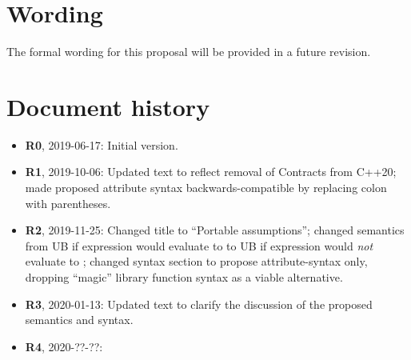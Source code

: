\section{Wording}

The formal wording for this proposal will be provided in a future revision.

\section*{Document history}

\begin{itemize}
\item \textbf{R0}, 2019-06-17: Initial version.
\item \textbf{R1}, 2019-10-06: Updated text to reflect removal of Contracts from C++20; made proposed attribute syntax backwards-compatible by replacing colon with parentheses.
\item \textbf{R2}, 2019-11-25: Changed title to ``Portable assumptions''; changed semantics from UB if expression would evaluate to  to UB if expression would \emph{not} evaluate to ; changed syntax section to propose attribute-syntax only, dropping ``magic'' library function syntax as a viable alternative.
\item \textbf {R3}, 2020-01-13: Updated text to clarify the discussion of the proposed semantics and syntax.
\item \textbf{R4}, 2020-??-??:
\end{itemize}

\renewcommand{\bibname}{References}



